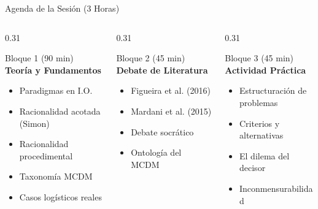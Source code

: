 \documentclass[aspectratio=169, 10pt]{beamer}
\begin{document}
\begin{frame}{Agenda de la Sesión (3 Horas)}
    \begin{columns}[T]
        \begin{column}{0.31\textwidth}
            \begin{block}{Bloque 1 (90 min)}
                \textbf{Teoría y Fundamentos}
                \begin{itemize}
                    \scriptsize
                    \item Paradigmas en I.O.
                    \item Racionalidad acotada (Simon)
                    \item Racionalidad procedimental
                    \item Taxonomía MCDM
                    \item Casos logísticos reales
                \end{itemize}
            \end{block}
        \end{column}
        
        \begin{column}{0.31\textwidth}
            \begin{exampleblock}{Bloque 2 (45 min)}
                \textbf{Debate de Literatura}
                \begin{itemize}
                    \scriptsize
                    \item Figueira et al. (2016)
                    \item Mardani et al. (2015)
                    \item Debate socrático
                    \item Ontología del MCDM
                \end{itemize}
            \end{exampleblock}
        \end{column}
        
        \begin{column}{0.31\textwidth}
            \begin{alertblock}{Bloque 3 (45 min)}
                \textbf{Actividad Práctica}
                \begin{itemize}
                    \scriptsize
                    \item Estructuración de problemas
                    \item Criterios y alternativas
                    \item El dilema del decisor
                    \item Inconmensurabilidad
                \end{itemize}
            \end{alertblock}
        \end{column}
    \end{columns}
\end{frame}
\end{document}
